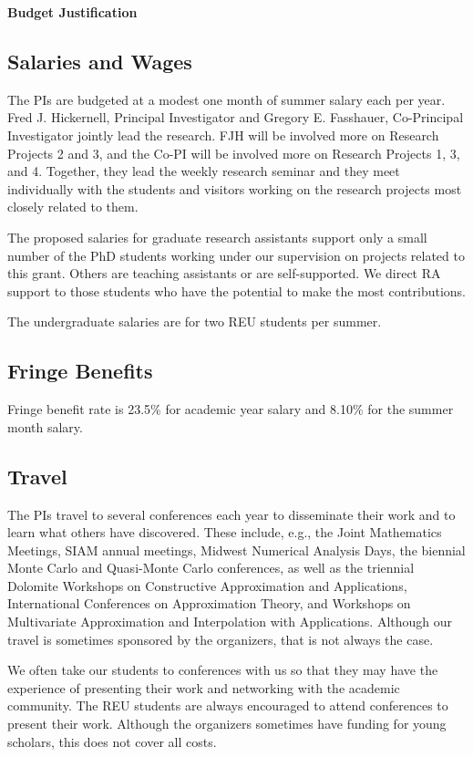\documentclass[11pt]{NSFamsart}
\begin{document}

\centerline{\textbf{\Large Budget Justification}}

\subsection*{Salaries and Wages}

The PIs are budgeted at a modest one month of summer salary each per year.  Fred J. Hickernell, Principal Investigator and Gregory E. Fasshauer, Co-Principal Investigator jointly lead the research.  FJH will be involved more on Research Projects 2 and 3, and the Co-PI will be involved more on Research Projects 1, 3, and 4.  Together, they lead the weekly research seminar and they meet individually with the students and visitors working on the research projects most closely related to them.

The proposed salaries for graduate research assistants support only a small number of the PhD students working under our supervision on projects related to this grant.  Others are teaching assistants or are self-supported.  We direct RA support to those students who have the potential to make the most contributions.

The undergraduate salaries are for two REU students per summer.

\subsection*{Fringe Benefits}
Fringe benefit rate is 23.5\% for academic year salary and 8.10\% for the summer month
salary.

\subsection*{Travel}
The PIs travel to several conferences each year to disseminate their work and to learn what others have discovered.  These include, e.g., the Joint Mathematics Meetings, SIAM annual meetings, Midwest Numerical Analysis Days, the biennial Monte Carlo and Quasi-Monte Carlo conferences, as well as the triennial Dolomite Workshops on Constructive Approximation and Applications, International Conferences on Approximation Theory, and Workshops on Multivariate Approximation and Interpolation with Applications. Although our travel is sometimes sponsored by the organizers, that is not always the case.

We often take our students to conferences with us so that they may have the experience of presenting their work and networking with the academic community.  The REU students are always encouraged to attend conferences to present their work.  Although the organizers sometimes have funding for young scholars, this does not cover all costs.
\end{document}
